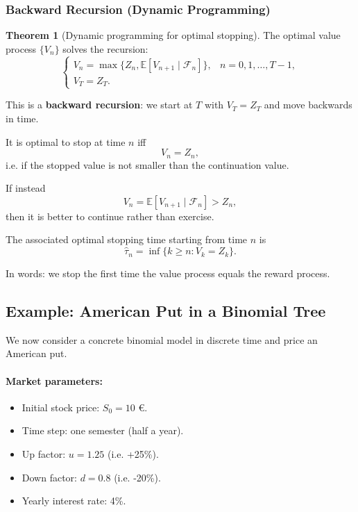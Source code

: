 \documentclass[12pt,a4paper]{article}
\theoremstyle{definition}
\newtheorem{theorem}{Theorem}[section]
\begin{document}
\subsubsection{Backward Recursion (Dynamic Programming)}

\begin{theorem}[Dynamic programming for optimal stopping]
The optimal value process $\{V_n\}$ solves the recursion:
\[
\boxed{
\begin{cases}
V_n = \max\{Z_n, \mathbb{E}[V_{n+1} \mid \mathcal{F}_n]\}, & n = 0, 1, \ldots, T-1, \\
V_T = Z_T.
\end{cases}
}
\]
\end{theorem}

This is a \textbf{backward recursion}: we start at $T$ with $V_T = Z_T$ and move backwards in time.

It is optimal to stop at time $n$ iff
\[
V_n = Z_n,
\]
i.e. if the stopped value is not smaller than the continuation value.

If instead
\[
V_n = \mathbb{E}[V_{n+1} \mid \mathcal{F}_n] > Z_n,
\]
then it is better to continue rather than exercise.

The associated optimal stopping time starting from time $n$ is
\[
\widehat{\tau}_n = \inf\{k \geq n : V_k = Z_k\}.
\]

In words: we stop the first time the value process equals the reward process.

\subsection{Example: American Put in a Binomial Tree}

We now consider a concrete binomial model in discrete time and price an American put.

\paragraph{Market parameters:}
\begin{itemize}
\item Initial stock price: $S_0 = 10$ €.
\item Time step: one semester (half a year).
\item Up factor: $u = 1.25$ (i.e. +25\%).
\item Down factor: $d = 0.8$ (i.e. -20\%).
\item Yearly interest rate: 4\%.
\end{itemize}
\end{document}
